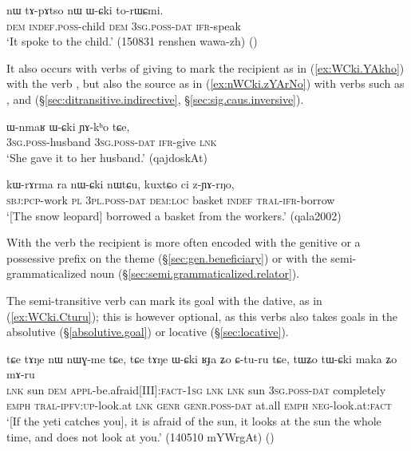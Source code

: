\begin{exe}
\ex \label{ex:WCki.torWCmi}
\gll nɯ tɤ-pɤtso nɯ ɯ-ɕki to-rɯɕmi. \\
\textsc{dem} \textsc{indef}.\textsc{poss}-child \textsc{dem} \textsc{3sg}.\textsc{poss}-\textsc{dat} \textsc{ifr}-speak \\
\glt  `It spoke to the child.' (150831 renshen wawa-zh) ()
\end{exe}

It also occurs with verbs of giving to mark the recipient as in (\ref{ex:WCki.YAkho}) with the verb , but also the source as in (\ref{ex:nWCki.zYArNo}) with verbs such as ,  and  (§\ref{sec:ditransitive.indirective}, §\ref{sec:sig.caus.inversive}).

 

\begin{exe}
\ex \label{ex:WCki.YAkho}
\gll  ɯ-nmaʁ ɯ-ɕki ɲɤ-kʰo tɕe,  \\
\textsc{3sg}.\textsc{poss}-husband \textsc{3sg}.\textsc{poss}-\textsc{dat} \textsc{ifr}-give \textsc{lnk} \\
\glt `She gave it to her husband.' (qajdoskAt)
\end{exe}

\begin{exe}
\ex \label{ex:nWCki.zYArNo}
\gll 
kɯ-rɤrma ra nɯ-ɕki nɯtɕu, kuxtɕo ci z-ɲɤ-rŋo, \\
\textsc{sbj}:\textsc{pcp}-work \textsc{pl} \textsc{3pl}.\textsc{poss}-\textsc{dat} \textsc{dem}:\textsc{loc} basket \textsc{indef} \textsc{tral}-\textsc{ifr}-borrow \\
\glt `[The snow leopard] borrowed a basket from the workers.' (qala2002)
\end{exe}

With the verb  the recipient is more often encoded with the genitive or a possessive prefix on the theme (§\ref{sec:gen.beneficiary}) or with the semi-grammati\-ca\-lized noun  (§\ref{sec:semi.grammaticalized.relator}).

 
The semi-transitive verb  can mark its goal with the dative, as in (\ref{ex:WCki.Cturu}); this is however optional, as this verbs also takes goals in the absolutive (§\ref{absolutive.goal}) or locative (§\ref{sec:locative}).

\begin{exe}
\ex \label{ex:WCki.Cturu}
\gll tɕe tɤŋe nɯ nɯɣ-me tɕe, tɕe tɤŋe ɯ-ɕki ʁɟa ʑo ɕ-tu-ru tɕe, tɯʑo tɯ-ɕki maka ʑo mɤ-ru \\
\textsc{lnk} sun \textsc{dem} \textsc{appl}-be.afraid[III]:\textsc{fact}-\textsc{1sg} \textsc{lnk} \textsc{lnk} sun \textsc{3sg}.\textsc{poss}-\textsc{dat} completely \textsc{emph} \textsc{tral}-\textsc{ipfv}:\textsc{up}-look.at \textsc{lnk} \textsc{genr} \textsc{genr}.\textsc{poss}-\textsc{dat} at.all \textsc{emph} \textsc{neg}-look.at:\textsc{fact} \\
\glt `[If the yeti catches you], it is afraid of the sun, it looks at the sun the whole time, and does not look at you.' (140510 mYWrgAt)
()
\end{exe}

